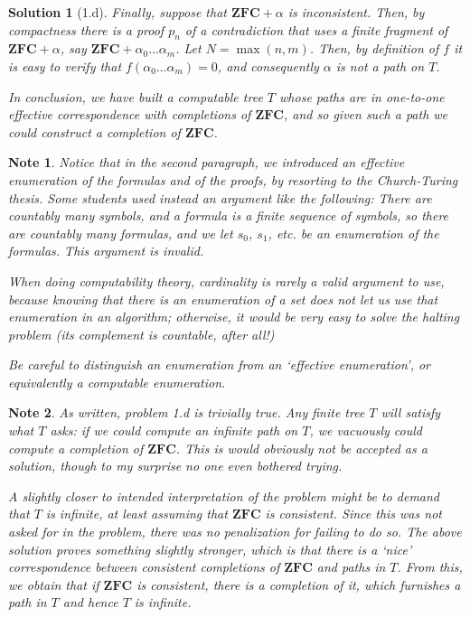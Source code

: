 \documentclass{article}
\theoremstyle{nonumberplain}
\newtheorem{sol}{Solution}
\newtheorem{note}{Note}
\newcommand{\ZFC}{\mathbf{ZFC}}
\begin{document}
\begin{sol}[1.d]
Finally, suppose that $\ZFC + \alpha$ is inconsistent. Then, by compactness there is a proof $p_n$ of a contradiction that uses a finite fragment of $\ZFC + \alpha$, say $\ZFC + \alpha_0 \dots \alpha_m$. Let $N = \max(n,m)$. Then, by definition of $f$ it is easy to verify that $f(\alpha_0 \dots \alpha_m) = 0$, and consequently $\alpha$ is not a path on $T$.

In conclusion, we have built a computable tree $T$ whose paths are in one-to-one effective correspondence with completions of $\ZFC$, and so given such a path we could construct a completion of $\ZFC$.
\end{sol}

\begin{note}
Notice that in the second paragraph, we introduced an \emph{effective} enumeration of the formulas and of the proofs, by resorting to the Church-Turing thesis. Some students used instead an argument like the following: There are countably many symbols, and a formula is a finite sequence of symbols, so there are countably many formulas, and we let $s_0$, $s_1$, etc. be an enumeration of the formulas. This argument is invalid.

When doing computability theory, cardinality is rarely a valid argument to use, because knowing that there is an enumeration of a set does not let us use that enumeration in an algorithm; otherwise, it would be very easy to solve the halting problem (its complement is countable, after all!)

Be careful to distinguish an enumeration from an `effective enumeration', or equivalently a computable enumeration.
\end{note}

\begin{note}
As written, problem 1.d is trivially true. Any finite tree $T$ will satisfy what $T$ asks: if we could compute an infinite path on $T$, we vacuously could compute a completion of $\ZFC$. This is would obviously not be accepted as a solution, though to my surprise no one even bothered trying.

A slightly closer to intended interpretation of the problem might be to demand that $T$ is infinite, at least assuming that $\ZFC$ is consistent. Since this was not asked for in the problem, there was no penalization for failing to do so. The above solution proves something slightly stronger, which is that there is a `nice' correspondence between consistent completions of $\ZFC$ and paths in $T$. From this, we obtain that if $\ZFC$ is consistent, there is a completion of it, which furnishes a path in $T$ and hence $T$ is infinite.
\end{note}
\end{document}
